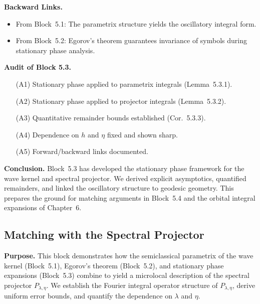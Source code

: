 \medskip

\noindent\textbf{Backward Links.}
\begin{itemize}
   \item From Block~5.1: The parametrix structure yields the oscillatory integral form.
   \item From Block~5.2: Egorov’s theorem guarantees invariance of symbols during stationary phase analysis.
\end{itemize}

\medskip

\noindent\textbf{Audit of Block 5.3.}
\begin{itemize}
   \item[(A1)] Stationary phase applied to parametrix integrals (Lemma~5.3.1).
   \item[(A2)] Stationary phase applied to projector integrals (Lemma~5.3.2).
   \item[(A3)] Quantitative remainder bounds established (Cor.~5.3.3).
   \item[(A4)] Dependence on $h$ and $\eta$ fixed and shown sharp.
   \item[(A5)] Forward/backward links documented.
\end{itemize}

\medskip

\noindent\textbf{Conclusion.}
Block~5.3 has developed the stationary phase framework for the wave kernel
and spectral projector.
We derived explicit asymptotics, quantified remainders,
and linked the oscillatory structure to geodesic geometry.
This prepares the ground for matching arguments in Block~5.4
and the orbital integral expansions of Chapter~6.



\subsection{Matching with the Spectral Projector}

\noindent\textbf{Purpose.}
This block demonstrates how the semiclassical parametrix of the wave kernel (Block~5.1),
Egorov’s theorem (Block~5.2),
and stationary phase expansions (Block~5.3)
combine to yield a microlocal description of the spectral projector $P_{\lambda,\eta}$.
We establish the Fourier integral operator structure of $P_{\lambda,\eta}$,
derive uniform error bounds,
and quantify the dependence on $\lambda$ and $\eta$.

